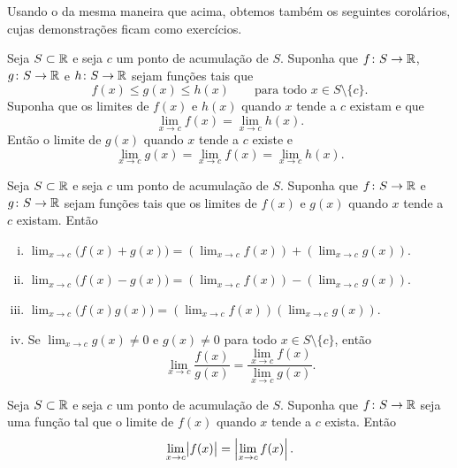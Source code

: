 Usando o  da mesma maneira que acima, obtemos também
os seguintes corolários, cujas demonstrações ficam como exercícios.

\begin{cor} \label{fsqueeze:cor}
Seja $S \subset {\mathbb{R}}$ e seja $c$ um ponto de acumulação de $S$.
Suponha que $f \colon S \to {\mathbb{R}}$,
$g \colon S \to {\mathbb{R}}$ e $h \colon S \to {\mathbb{R}}$ sejam funções tais que
\begin{equation*}
f(x) \leq g(x) \leq h(x) \qquad \text{para todo } x \in S \setminus \{ c \}.
\end{equation*}
Suponha que os limites de $f(x)$ e $h(x)$ quando $x$ tende a $c$ existam e que
\begin{equation*}
\lim_{x\to c} f(x) = \lim_{x\to c} h(x) .
\end{equation*}
Então o limite de $g(x)$ quando $x$ tende a $c$ existe e
\begin{equation*}
\lim_{x\to c} g(x) =
\lim_{x\to c} f(x) = \lim_{x\to c} h(x) .
\end{equation*}
\end{cor}

\begin{cor} \label{falg:cor}
Seja $S \subset {\mathbb{R}}$ e seja $c$ um ponto de acumulação de $S$.
Suponha que $f \colon S \to {\mathbb{R}}$ e
$g \colon S \to {\mathbb{R}}$ sejam funções tais que
os limites de $f(x)$ e $g(x)$ quando $x$ tende a $c$ existam.
Então
\begin{enumerate}[(i)]
\item
$\displaystyle
\lim_{x\to c} \bigl(f(x)+g(x)\bigr) = \left(\lim_{x\to c} f(x)\right) +
\left(\lim_{x\to c} g(x)\right) .
$
\item
$\displaystyle
\lim_{x\to c} \bigl(f(x)-g(x)\bigr) = \left(\lim_{x\to c} f(x)\right) -
\left(\lim_{x\to c} g(x)\right) .
$
\item
$\displaystyle
\lim_{x\to c} \bigl(f(x)g(x)\bigr) = \left(\lim_{x\to c} f(x)\right)
\left(\lim_{x\to c} g(x)\right) .
$
\item \label{falg:cor:iv} Se
$\displaystyle \lim_{x\to c} g(x) \neq 0$
e $g(x) \neq 0$ para todo $x \in S \setminus \{ c \}$, então
\begin{equation*}
\lim_{x\to c} \frac{f(x)}{g(x)} =
\frac{\lim_{x\to c} f(x)}{\lim_{x\to c} g(x)} .
\end{equation*}
\end{enumerate}
\end{cor}

\begin{cor} \label{fabs:cor}
Seja $S \subset {\mathbb{R}}$ e seja $c$ um ponto de acumulação de $S$.
Suponha que $f \colon S \to {\mathbb{R}}$ seja uma função tal que o limite de $f(x)$ quando $x$ tende a $c$
exista.
Então
\begin{equation*}
\lim_{x\to c} \bigl\lvert {f(x)} \bigr\rvert =
\left\lvert {\lim_{x\to c} f(x)} \right\rvert.
\end{equation*}
\end{cor}

